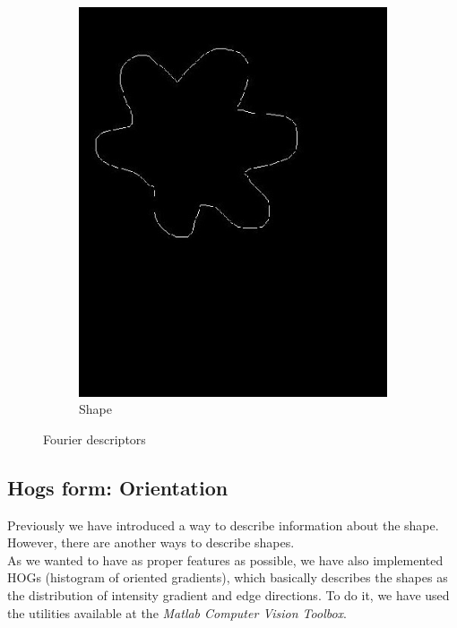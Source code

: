 \documentclass[11]{article}
\begin{document}
\begin{figure}[H]
\begin{subfigure}[t]{0.45\textwidth}
    \includegraphics[scale=0.25]{images/shape.jpg}
    \caption{Shape}
    \label{fourier2}
    \end{subfigure}
    \label{fourier}
    \caption{Fourier descriptors}
\end{figure}


\subsection{Hogs form: Orientation}
Previously we have introduced a way to describe information about the shape. However, there are another ways to describe shapes. 
\\
As we wanted to have as proper features as possible, we have also implemented HOGs (histogram of oriented gradients), which basically describes the shapes as the distribution of intensity gradient and edge directions. To do it, we have used the utilities available at the \textit{Matlab Computer Vision Toolbox}.
\end{document}
